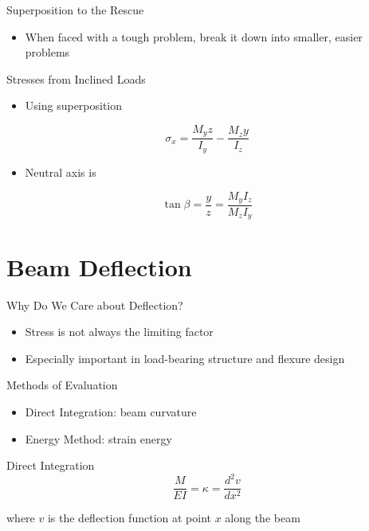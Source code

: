 \documentclass[10pt, svgnames]{beamer}
\begin{document}
\begin{frame}[label={sec:org2c3ac82}]{Superposition to the Rescue}
\begin{itemize}
\item When faced with a tough problem, break it down into smaller, easier
problems
\end{itemize}
\end{frame}

\begin{frame}[label={sec:org5a6aeab}]{Stresses from Inclined Loads}
\begin{itemize}
\item Using superposition
\end{itemize}

\[\sigma_x = \frac{M_y z}{I_y} - \frac{M_z y}{I_z}\]

\begin{itemize}
\item Neutral axis is
\end{itemize}

\[\tan \beta = \frac{y}{z} = \frac{M_y I_z}{M_z I_y}\]
\end{frame}

\section{Beam Deflection}
\label{beam-deflection}
\begin{frame}[label={sec:org3bfab5f}]{Why Do We Care about Deflection?}
\begin{itemize}
\item Stress is not always the limiting factor

\item Especially important in load-bearing structure and flexure design
\end{itemize}
\end{frame}

\begin{frame}[label={sec:orgc54f303}]{Methods of Evaluation}
\begin{itemize}
\item Direct Integration: beam curvature

\item Energy Method: strain energy
\end{itemize}
\end{frame}

\begin{frame}[label={sec:org306070d}]{Direct Integration}
\[\frac{M}{EI} = \kappa = \frac{d^2 v}{dx^2}\]

where \(v\) is the deflection function at point \(x\) along the beam
\end{frame}
\end{document}
